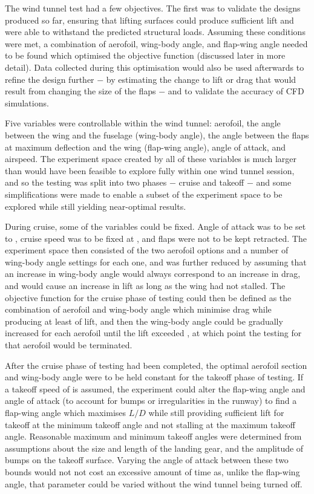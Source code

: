 \documentclass[../../main.tex]{subfiles}
\begin{document}
The wind tunnel test had a few objectives.
The first was to validate the designs produced so far, ensuring that lifting surfaces could produce sufficient lift and were able to withstand the predicted structural loads.
Assuming these conditions were met, a combination of aerofoil, wing-body angle, and flap-wing angle needed to be found which optimised the objective function (discussed later in more detail).
Data collected during this optimisation would also be used afterwards to refine the design further $-$ by estimating the change to lift or drag that would result from changing the size of the flaps $-$ and to validate the accuracy of CFD simulations. 

Five variables were controllable within the wind tunnel: aerofoil, the angle between the wing and the fuselage (wing-body angle), the angle between the flaps at maximum deflection and the wing (flap-wing angle), angle of attack, and airspeed.
The experiment space created by all of these variables is much larger than would have been feasible to explore fully within one wind tunnel session, and so the testing was split into two phases $-$ cruise and takeoff $-$ and some simplifications were made to enable a subset of the experiment space to be explored while still yielding near-optimal results.

During cruise, some of the variables could be fixed.
Angle of attack was to be set to , cruise speed was to be fixed at , and flaps were not to be kept retracted.
The experiment space then consisted of the two aerofoil options and a number of wing-body angle settings for each one, and was further reduced by assuming that an increase in wing-body angle would always correspond to an increase in drag, and would cause an increase in lift as long as the wing had not stalled.
The objective function for the cruise phase of testing could then be defined as the combination of aerofoil and wing-body angle which minimise drag while producing at least  of lift, and then the wing-body angle could be gradually increased for each aerofoil until the lift exceeded , at which point the testing for that aerofoil would be terminated. 

After the cruise phase of testing had been completed, the optimal aerofoil section and wing-body angle were to be held constant for the takeoff phase of testing.
If a takeoff speed of  is assumed, the experiment could alter the flap-wing angle and angle of attack (to account for bumps or irregularities in the runway) to find a flap-wing angle which maximises $L/D$ while still providing sufficient lift for takeoff at the minimum takeoff angle and not stalling at the maximum takeoff angle.
Reasonable maximum and minimum takeoff angles were determined from assumptions about the size and length of the landing gear, and the amplitude of bumps on the takeoff surface.
Varying the angle of attack between these two bounds would not not cost an excessive amount of time as, unlike the flap-wing angle, that parameter could be varied without the wind tunnel being turned off. 
\end{document}

